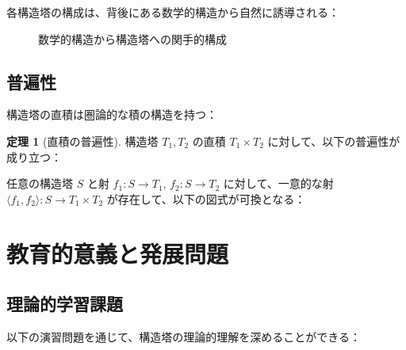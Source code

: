 \documentclass[a4paper,12pt]{ltjsarticle}
\theoremstyle{definition}
\newtheorem{theorem}[definition]{定理}
\begin{document}
各構造塔の構成は、背後にある数学的構造から自然に誘導される：

\begin{figure}[h]
\centering
{}
\caption{数学的構造から構造塔への関手的構成}
\end{figure}

\subsection{普遍性}

構造塔の直積は圏論的な積の構造を持つ：

\begin{theorem}[直積の普遍性]
構造塔 $T_1, T_2$ の直積 $T_1 \times T_2$ に対して、以下の普遍性が成り立つ：

任意の構造塔 $S$ と射 $f_1 : S \to T_1$, $f_2 : S \to T_2$ に対して、一意的な射 $\langle f_1, f_2 \rangle : S \to T_1 \times T_2$ が存在して、以下の図式が可換となる：

\begin{center}
\end{center}
\end{theorem}

\section{教育的意義と発展問題}

\subsection{理論的学習課題}

以下の演習問題を通じて、構造塔の理論的理解を深めることができる：
\end{document}
